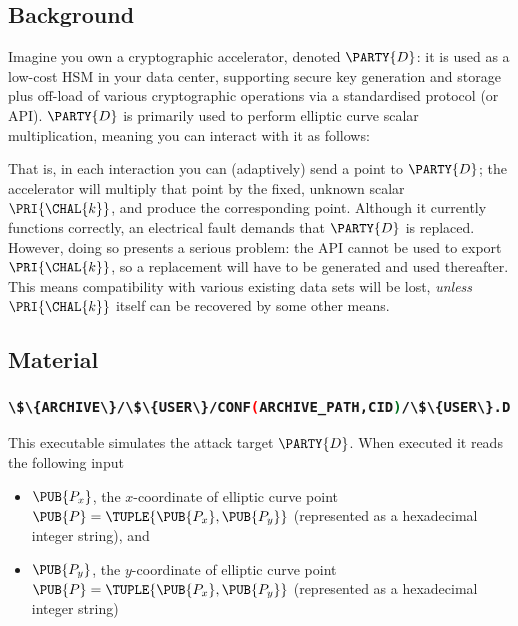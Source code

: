 \documentclass[crop={false},multi={true},tikz={true}]{standalone}
\begin{document}

\subsection{Background}

Imagine you own a cryptographic accelerator, denoted $\PARTY{D}$: it is used
as a low-cost HSM in your data center, supporting secure key generation and 
storage plus off-load of various cryptographic operations via a standardised 
protocol (or API).  $\PARTY{D}$ is primarily used to perform elliptic curve
scalar multiplication, meaning you can interact with it as follows:

\begin{center}

\end{center}

\noindent
That is, in each interaction you can (adaptively) send 
a point
to $\PARTY{D}$; the accelerator will
multiply that point by the fixed, unknown scalar $\PRI{\CHAL{k}}$,
and produce 
the corresponding point.
Although it currently functions correctly, an electrical fault demands that
$\PARTY{D}$ is replaced.  However, doing so presents a serious problem: the 
API cannot be used to export $\PRI{\CHAL{k}}$, so a replacement will have 
to be generated and used thereafter.  This means compatibility with various
existing data sets will be lost, {\em unless} $\PRI{\CHAL{k}}$ itself can 
be recovered by some other means.

\subsection{Material}

\subsubsection{\lstinline[language={bash}]|\$\{ARCHIVE\}/\$\{USER\}/CONF(ARCHIVE_PATH,CID)/\$\{USER\}.D|}

This executable simulates the attack target $\PARTY{D}$.  When executed it 
reads the following input

\begin{itemize}
\item $\PUB{P_x}$,
      the $x$-coordinate of elliptic curve point $\PUB{P} = \TUPLE{ \PUB{P_x}, \PUB{P_y} }$
      (represented as a  hexadecimal integer string),      
      and
\item $\PUB{P_y}$,
      the $y$-coordinate of elliptic curve point $\PUB{P} = \TUPLE{ \PUB{P_x}, \PUB{P_y} }$
      (represented as a  hexadecimal integer string)
\end{itemize}
\end{document}
